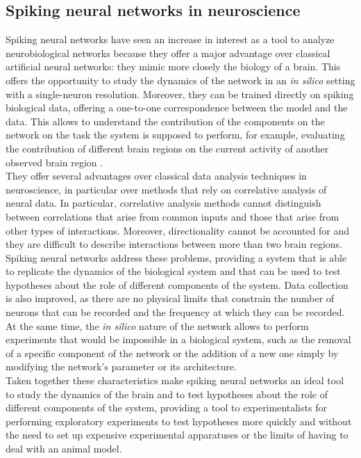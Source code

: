   \subsection{Spiking neural networks in neuroscience}
  Spiking neural networks have seen an increase in interest as a tool to analyze neurobiological networks because they offer a major advantage over classical artificial neural networks: they mimic more closely the biology of a brain.
  This offers the opportunity to study the dynamics of the network in an \textit{in silico} setting with a single-neuron resolution.
  Moreover, they can be trained directly on spiking biological data, offering a one-to-one correspondence between the model and the data.
  This allows to understand the contribution of the components on the network on the task the system is supposed to perform, for example, evaluating the contribution of different brain regions on the current activity of another observed brain region \cite{curbd}.\\
  They offer several advantages over classical data analysis techniques in neuroscience, in particular over methods that rely on correlative analysis of neural data.
  In particular, correlative analysis methods cannot distinguish between correlations that arise from common inputs and those that arise from other types of interactions.
  Moreover, directionality cannot be accounted for and they are difficult to describe interactions between more than two brain regions.\\
  Spiking neural networks address these problems, providing a system that is able to replicate the dynamics of the biological system and that can be used to test hypotheses about the role of different components of the system.
  Data collection is also improved, as there are no physical limits that constrain the number of neurons that can be recorded and the frequency at which they can be recorded.
  At the same time, the \textit{in silico} nature of the network allows to perform experiments that would be impossible in a biological system, such as the removal of a specific component of the network or the addition of a new one simply by modifying the network's parameter or its architecture.\\
  Taken together these characteristics make spiking neural networks an ideal tool to study the dynamics of the brain and to test hypotheses about the role of different components of the system, providing a tool to experimentalists for performing exploratory experiments to test hypotheses more quickly and without the need to set up expensive experimental apparatuses or the limits of having to deal with an animal model.

